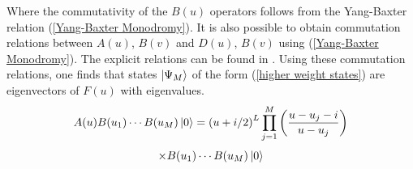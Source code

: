 %
%
Where the commutativity of the $B(u)$ operators follows from the Yang-Baxter relation (\ref{Yang-Baxter Monodromy}). It is also possible to obtain commutation relations between $A(u)$, $B(v)$ and $D(u)$, $B(v)$ using (\ref{Yang-Baxter Monodromy}). The explicit relations can be found in \cite{Algebraic Bethe Ansatz}. Using these commutation relations, one finds that states $\ket{\Psi_M}$ of the form (\ref{higher weight states}) are eigenvectors of $F(u)$ with eigenvalues.
%
%
\begin{equation*}
A(u) B(u_1) \cdots B(u_M) \ket{0}
=
\left( u + i / 2 \right)^L
\prod_{j=1}^M \left( \frac{u - u_j - i}{u - u_j}
\right) 
\end{equation*}
%
%
\begin{equation}
\times B(u_1) \cdots B(u_M) \ket{0}
\end{equation}
%
%

